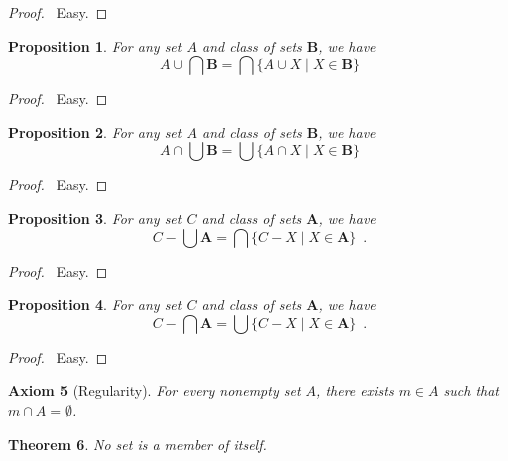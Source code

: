 \documentclass{article}
\let\qed\relax
\newtheorem{axiom}{Axiom}
\newtheorem{proposition}[axiom]{Proposition}
\newtheorem{theorem}[axiom]{Theorem}
\theoremstyle{definition}
\begin{document}
    \begin{proof}
        \pf\ Easy. \qed
    \end{proof}

    \begin{proposition}
        For any set $A$ and class of sets $\mathbf{B}$, we have
        \[ A \cup \bigcap \mathbf{B} = \bigcap \{ A \cup X \mid X \in \mathbf{B} \} \]
    \end{proposition}

    \begin{proof}
        \pf\ Easy. \qed
    \end{proof}

    \begin{proposition}
        For any set $A$ and class of sets $\mathbf{B}$, we have
        \[ A \cap \bigcup \mathbf{B} = \bigcup \{ A \cap X \mid X \in \mathbf{B} \} \]
    \end{proposition}

    \begin{proof}
        \pf\ Easy. \qed
    \end{proof}

    \begin{proposition}
        For any set $C$ and class of sets $\mathbf{A}$, we have
        \[ C - \bigcup \mathbf{A} = \bigcap \{ C - X \mid X \in \mathbf{A} \} \enspace . \]
    \end{proposition}

    \begin{proof}
        \pf\ Easy. \qed
    \end{proof}

    \begin{proposition}
        For any set $C$ and class of sets $\mathbf{A}$, we have
        \[ C - \bigcap \mathbf{A} = \bigcup \{ C - X \mid X \in \mathbf{A} \} \enspace . \]
    \end{proposition}

    \begin{proof}
        \pf\ Easy. \qed
    \end{proof}

    \begin{axiom}[Regularity]
        For every nonempty set $A$, there exists $m \in A$ such that $m \cap A = \emptyset$.
    \end{axiom}

    \begin{theorem}
        No set is a member of itself.
    \end{theorem}
\end{document}
